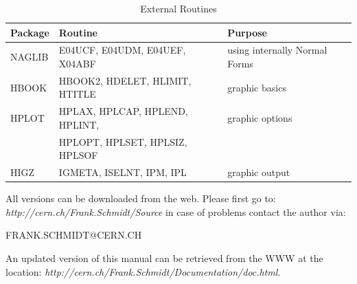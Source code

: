 \documentclass[a4paper,11pt]{report}
\begin{document}
\begin{table}[h]
\caption{External Routines}
\vspace{1em}
\label{T-ExtRou}
\scriptsize \centering
\begin{tabular}{|l|l|l|}
  \hline \rule[-3.75mm]{0mm}{10mm}
  {\bf\large Package} & {\bf\large Routine} & {\bf\large Purpose} \\
  \hline \rule[-3.75mm]{0mm}{10mm} NAGLIB & E04UCF, E04UDM, E04UEF,
  X04ABF & using internally Normal
  Forms \\
  \hline \rule[-3.75mm]{0mm}{10mm}
  HBOOK & HBOOK2, HDELET, HLIMIT, HTITLE & graphic basics \\
  \hline \rule[-3.75mm]{0mm}{10mm}
  HPLOT & HPLAX, HPLCAP, HPLEND, HPLINT, & graphic options \\
  \cline{2-2} \rule[-3.75mm]{0mm}{10mm}
  & HPLOPT, HPLSET, HPLSIZ, HPLSOF &  \\
  \hline \rule[-3.75mm]{0mm}{10mm}
  HIGZ & IGMETA, ISELNT, IPM, IPL & graphic output \\
  \hline
\end{tabular}
\normalsize
\end{table}


All versions can be downloaded from the web. Please first
go to: 
{\em http://cern.ch/Frank.Schmidt/Source}
in case of problems contact the author
via: \vspace*{1cm} \Large
\begin{center}
  FRANK.SCHMIDT@CERN.CH
\end{center}
\bigskip An updated version of this manual can be retrieved from the
WWW at the location: {\em
  http://cern.ch/Frank.Schmidt/Documentation/doc.html}.  \normalsize 
\end{document}
